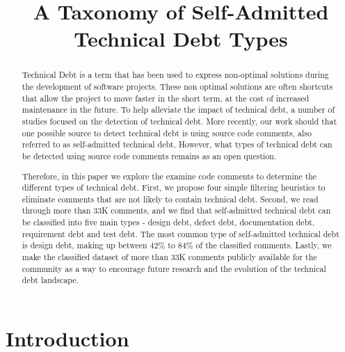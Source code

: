 \documentclass[conference]{IEEEtran}
\begin{document}
\title{A Taxonomy of Self-Admitted Technical Debt Types}

\author{

}

\maketitle

\begin{abstract} Technical Debt is a term that has been used to express non-optimal solutions during the development of software projects. These non optimal solutions are often shortcuts that allow the project to move faster in the short term, at the cost of increased maintenance in the future. To help alleviate the impact of technical debt, a number of studies focused on the detection of technical debt. More recently, our work should that one possible source to detect technical debt is using source code comments, also referred to as self-admitted technical debt. However, what types of technical debt can be detected using source code comments remains as an open question.
	
Therefore, in this paper we explore the examine code comments to determine the different types of technical debt. First, we propose four simple filtering heuristics to eliminate comments that are not likely to contain technical debt. Second, we read through more than 33K comments, and we find that self-admitted technical debt can be classified into five main types - design debt, defect debt, documentation debt, requirement debt and test debt. The  most common type of self-admitted technical debt is design debt, making up between 42\% to 84\% of the classified comments. Lastly, we make the classified dataset of more than 33K comments publicly available for the community as a way to encourage future research and the evolution of the technical debt landscape.
	
\end{abstract}

\IEEEpeerreviewmaketitle

\section{Introduction}
\label{sec:introduction}

\end{document}
